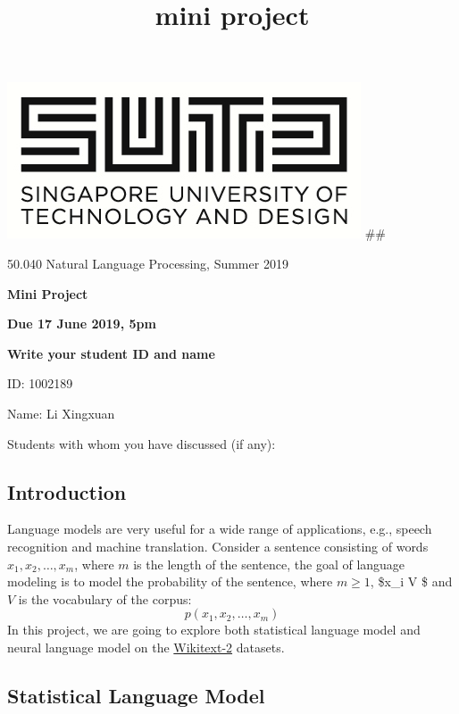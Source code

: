 \documentclass[11pt]{article}
\title{mini project}
\makeatletter
\def\maxwidth{\ifdim\Gin@nat@width>\linewidth\linewidth
    \else\Gin@nat@width\fi}
\let\Oldincludegraphics\includegraphics
\renewcommand{\includegraphics}[1]{\Oldincludegraphics[width=.8\maxwidth]{#1}}
\makeatother
\begin{document}
    
    
    \maketitle
    
    

    
    \includegraphics{img/sutd.png} \#\#

50.040 Natural Language Processing, Summer 2019

\textbf{Mini Project}

\textbf{Due 17 June 2019, 5pm}

    \textbf{Write your student ID and name}

ID: 1002189

Name: Li Xingxuan

Students with whom you have discussed (if any):

    \hypertarget{introduction}{%
\subsection{Introduction}\label{introduction}}

Language models are very useful for a wide range of applications, e.g.,
speech recognition and machine translation. Consider a sentence
consisting of words \(x_1, x_2, …, x_m\), where \(m\) is the length of
the sentence, the goal of language modeling is to model the probability
of the sentence, where \(m \geq 1\), \$x\_i \in V \$ and \(V\) is the
vocabulary of the corpus: \[p(x_1, x_2, …, x_m)\] In this project, we
are going to explore both statistical language model and neural language
model on the
\href{https://blog.einstein.ai/the-wikitext-long-term-dependency-language-modeling-dataset/}{Wikitext-2}
datasets.

\hypertarget{statistical-language-model}{%
\subsection{Statistical Language
Model}\label{statistical-language-model}}
\end{document}
